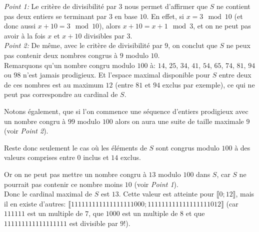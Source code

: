 \documentclass[11pt] {article}
\begin{document}
\textit{Point 1:} Le critère de divisibilité par $3$ nous permet d'affirmer que $S$ ne contient pas deux entiers se terminant par $3$ en base $10$. En effet, si $x = 3 \mod 10$ (et donc aussi $x+10 = 3 \mod 10$), alors $x+10 = x+1 \mod 3$, et on ne peut pas avoir à la fois $x$ et $x+10$ divisibles par $3$.\\

\textit{Point 2:} De même, avec le critère de divisibilité par $9$, on conclut que $S$ ne peux pas contenir deux nombres congrus à $9$ modulo $10$.\\

Remarquons qu'un nombre congru modulo $100$ à: $14$, $25$, $34$, $41$, $54$, $65$, $74$, $81$, $94$ ou $98$ n'est jamais prodigieux. Et l'espace maximal disponible pour $S$ entre deux de ces nombres est au maximum $12$ (entre $81$ et $94$ exclus par exemple), ce qui ne peut pas correspondre au cardinal de $S$.

Notons également, que si l'on commence une séquence d'entiers prodigieux avec un nombre congru à $99$ modulo $100$ alors on aura une suite de taille maximale $9$ (voir \textit{Point 2}).

Reste donc seulement le cas où les éléments de $S$ sont congrus modulo $100$ à des valeurs comprises entre $0$ inclus et $14$ exclus.

Or on ne peut pas mettre un nombre congru à $13$ modulo $100$ dans $S$, car $S$ ne pourrait pas contenir ce nombre moins $10$ (voir \textit{Point 1}).\\

Donc le cardinal maximal de $S$ est $13$.
Cette valeur est atteinte pour $\llbracket 0; 12 \rrbracket$, mais il en existe d'autres:
$\llbracket 111111111111111111000; 111111111111111111012 \rrbracket$ (car $111111$ est un multiple de $7$, que $1000$ est un multiple de $8$ et que $111111111111111111$ est divisible par $9$!).
\end{document}
